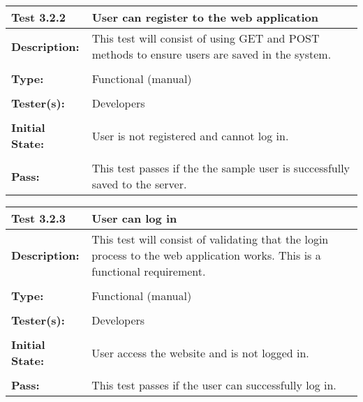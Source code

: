 \documentclass{article}
\begin{document}
\begin{tabularx}{\textwidth}{p{2cm}p{9cm}}
\toprule 
{\bf Test 3.2.2 } & {\bf User can register to the web application}\\
\midrule
\textbf{Description:} & This test will consist of using GET and POST methods to ensure users are saved in the system. \\[0.3\baselineskip]
                      &                     \\
\textbf{Type:} & Functional (manual)   \\[0.3\baselineskip]
                      &                     \\
\textbf{Tester(s):} & Developers \\[0.3\baselineskip]
                      &                     \\
\textbf{Initial State:} & User is not registered and cannot log in. \\[0.3\baselineskip]
                      &                     \\
\textbf{Pass:} & This test passes if the the sample user is successfully saved to the server.\\[0.3\baselineskip]
\bottomrule
\end{tabularx}

\begin{tabularx}{\textwidth}{p{2cm}p{9cm}}
\toprule 
{\bf Test 3.2.3 } & {\bf User can log in}\\
\midrule
\textbf{Description:} & This test will consist of validating that the login process to the web application works. This is a functional requirement. \\[0.3\baselineskip]
                      &                     \\
\textbf{Type:} & Functional (manual)   \\[0.3\baselineskip]
                      &                     \\
\textbf{Tester(s):} & Developers \\[0.3\baselineskip]
                      &                     \\
\textbf{Initial State:} & User access the website and is not logged in. \\[0.3\baselineskip]
                      &                     \\
\textbf{Pass:} & This test passes if the user can successfully log in. \\[0.3\baselineskip]
\end{tabularx}
\end{document}
